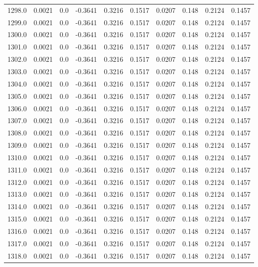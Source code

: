 \begin{longtable}{lrrrrrrrrr}
1298.0 & 0.0021 & 0.0 & -0.3641 & 0.3216 & 0.1517 & 0.0207 & 0.148 & 0.2124 & 0.1457 \\
1299.0 & 0.0021 & 0.0 & -0.3641 & 0.3216 & 0.1517 & 0.0207 & 0.148 & 0.2124 & 0.1457 \\
1300.0 & 0.0021 & 0.0 & -0.3641 & 0.3216 & 0.1517 & 0.0207 & 0.148 & 0.2124 & 0.1457 \\
1301.0 & 0.0021 & 0.0 & -0.3641 & 0.3216 & 0.1517 & 0.0207 & 0.148 & 0.2124 & 0.1457 \\
1302.0 & 0.0021 & 0.0 & -0.3641 & 0.3216 & 0.1517 & 0.0207 & 0.148 & 0.2124 & 0.1457 \\
1303.0 & 0.0021 & 0.0 & -0.3641 & 0.3216 & 0.1517 & 0.0207 & 0.148 & 0.2124 & 0.1457 \\
1304.0 & 0.0021 & 0.0 & -0.3641 & 0.3216 & 0.1517 & 0.0207 & 0.148 & 0.2124 & 0.1457 \\
1305.0 & 0.0021 & 0.0 & -0.3641 & 0.3216 & 0.1517 & 0.0207 & 0.148 & 0.2124 & 0.1457 \\
1306.0 & 0.0021 & 0.0 & -0.3641 & 0.3216 & 0.1517 & 0.0207 & 0.148 & 0.2124 & 0.1457 \\
1307.0 & 0.0021 & 0.0 & -0.3641 & 0.3216 & 0.1517 & 0.0207 & 0.148 & 0.2124 & 0.1457 \\
1308.0 & 0.0021 & 0.0 & -0.3641 & 0.3216 & 0.1517 & 0.0207 & 0.148 & 0.2124 & 0.1457 \\
1309.0 & 0.0021 & 0.0 & -0.3641 & 0.3216 & 0.1517 & 0.0207 & 0.148 & 0.2124 & 0.1457 \\
1310.0 & 0.0021 & 0.0 & -0.3641 & 0.3216 & 0.1517 & 0.0207 & 0.148 & 0.2124 & 0.1457 \\
1311.0 & 0.0021 & 0.0 & -0.3641 & 0.3216 & 0.1517 & 0.0207 & 0.148 & 0.2124 & 0.1457 \\
1312.0 & 0.0021 & 0.0 & -0.3641 & 0.3216 & 0.1517 & 0.0207 & 0.148 & 0.2124 & 0.1457 \\
1313.0 & 0.0021 & 0.0 & -0.3641 & 0.3216 & 0.1517 & 0.0207 & 0.148 & 0.2124 & 0.1457 \\
1314.0 & 0.0021 & 0.0 & -0.3641 & 0.3216 & 0.1517 & 0.0207 & 0.148 & 0.2124 & 0.1457 \\
1315.0 & 0.0021 & 0.0 & -0.3641 & 0.3216 & 0.1517 & 0.0207 & 0.148 & 0.2124 & 0.1457 \\
1316.0 & 0.0021 & 0.0 & -0.3641 & 0.3216 & 0.1517 & 0.0207 & 0.148 & 0.2124 & 0.1457 \\
1317.0 & 0.0021 & 0.0 & -0.3641 & 0.3216 & 0.1517 & 0.0207 & 0.148 & 0.2124 & 0.1457 \\
1318.0 & 0.0021 & 0.0 & -0.3641 & 0.3216 & 0.1517 & 0.0207 & 0.148 & 0.2124 & 0.1457 \\

\end{longtable}
